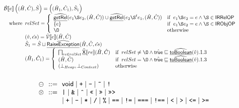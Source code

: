 \[\begin{array}{ll}
\aB \lbr e \rbr \left( (\hat{H},\hat{C}), \hat{S} \right) =  \left( (\hat{H}_1, \hat{C}_1), \hat{S}_1 \right)\\
\quad\wherec{
  relSet = \left\{
    \begin{array}{ll}
      \ahf{getRel}(e_1 \rel e_2, (\hat{H}, \hat{C}))\cup \ahf{getRel}(e_2 \rel^t e_1, (\hat{H}, \hat{C})) & \ifc{ e_1 \rel e_2 = e \land \rel \in \SF{IRRelOP}}\\
      \{ e \} & \ifc{ e_1 \rel e_2 = e \land \rel \in \SF{IRObjOP}}\\
      \O & \owc
    \end{array}
  \right.\\
  (\hat{v}, \hat{es}) = \hat{\V} \lbr e \rbr(\hat{H},\hat{C})\\
  \hat{S}_1 = \hat{S} \sqcup \ahf{RaiseException}(\hat{H}, \hat{C}, \hat{es})\\
  (\hat{H}_1, \hat{C}_1) =
    \left\{
      \begin{array}{ll}
        \bigsqcap_{re \in relSet} \ahf{X} \lbr re \rbr (\hat{H},\hat{C}) & 
          \ifc{ relSet \not= \O \land \hat\vtrue \sqsubseteq \ahf{toBoolean}(\hat{v}).1.3}\\
        (\hat{H}, \hat{C}) & 
          \ifc{ relSet = \O \land \hat\vtrue \sqsubseteq \ahf{toBoolean}(\hat{v}).1.3}\\
         (\bot_{Heap}, \bot_{Context}) & 
          \owc
      \end{array}
    \right.\\
}
\\\\
\end{array}
\]
\[
\begin{array}{l@{~~}r@{~~}ll}

 \preop & ::= & \SF{void} %
                \mid \TT{+} \mid \TT{-} \mid \TT{\~} \mid \TT{!} \\
 \inop & ::= & %
               \TT{|} \mid \TT{\&} 
               \mid \TT{\^} \mid \TT{<<} \mid \TT{>>} \mid \TT{>>>} \\
& & \mid \TT{+} \mid \TT{-} \mid \TT{*} \mid \TT{/} \mid \TT{\%} \mid \TT{==} \mid \TT{!=} 
               \mid \TT{===} \mid \TT{!==} \mid \TT{<} \mid \TT{>} \mid \TT{<=} \mid \TT{>=} \\

\end{array}
\]
